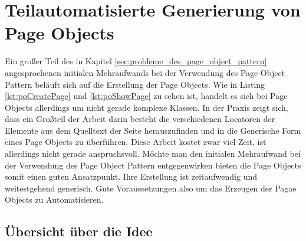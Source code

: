 \chapter{Teilautomatisierte Generierung von Page Objects}
\label{sec:teilautomatisierte_generierung_von_pageObjects}

Ein großer Teil des in Kapitel \ref{sec:probleme_des_page_object_pattern} angesprochenen initialen Mehraufwands bei der Verwendung des Page Object Pattern beläuft sich auf die Erstellung der Page Objects.
Wie in Listing \ref{lst:poCreatePage} und \ref{lst:poShowPage} zu sehen ist, handelt es sich bei Page Objects allerdings um nicht gerade komplexe Klassen. In der Praxis zeigt sich, dass ein Großteil der Arbeit darin besteht die verschiedenen Locatoren der Elemente aus dem Quelltext der Seite herauszufinden und in die Generische Form eines Page Objects zu überführen.
Diese Arbeit kostet zwar viel Zeit, ist allerdings nicht gerade anspruchsvoll.
Möchte man den initialen Mehraufwand bei der Verwendung des Page Object Pattern entgegenwirken bieten die Page Objects somit einen guten Ansatzpunkt.
Ihre Erstellung ist zeitaufwendig und weitestgehend generisch. Gute Voraussetzungen also um das Erzeugen der Pagae Objects zu Automatisieren.
\section{Übersicht über die Idee}
\label{sec:uebersicht_ueber_idee}


